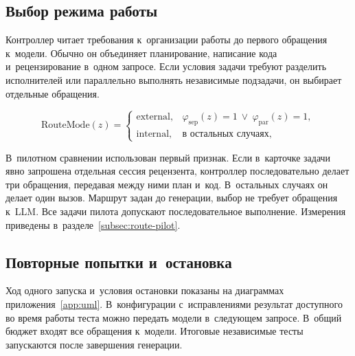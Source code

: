 \subsection{Выбор режима работы}\label{subsec:route-rule}
Контроллер читает требования к~организации работы до первого обращения к~модели. Обычно он объединяет планирование, написание кода и~рецензирование в~одном запросе. Если условия задачи требуют разделить исполнителей или параллельно выполнять независимые подзадачи, он выбирает отдельные обращения.
\begin{formulakey}
\begin{equation}
\mathrm{RouteMode}(z)=
\begin{cases}
\mathrm{external}, & \varphi_{\mathrm{sep}}(z)=1\ \lor\ \varphi_{\mathrm{par}}(z)=1,\\
\mathrm{internal}, & \text{в остальных случаях},
\end{cases}
\end{equation}
\begin{symbols}
\end{symbols}
\end{formulakey}
В~пилотном сравнении использован первый признак. Если в~карточке задачи явно запрошена отдельная сессия рецензента, контроллер последовательно делает три обращения, передавая между ними план и~код. В~остальных случаях он делает один вызов. Маршрут задан до генерации, выбор не требует обращения к~LLM. Все задачи пилота допускают последовательное выполнение. Измерения приведены в~разделе~\ref{subsec:route-pilot}.

\subsection{Повторные попытки и~остановка}
Ход одного запуска и~условия остановки показаны на диаграммах приложения~\ref{app:uml}. В~конфигурации с~исправлениями результат доступного во время работы теста можно передать модели в~следующем запросе. В~общий бюджет входят все обращения к~модели. Итоговые независимые тесты запускаются после завершения генерации.

